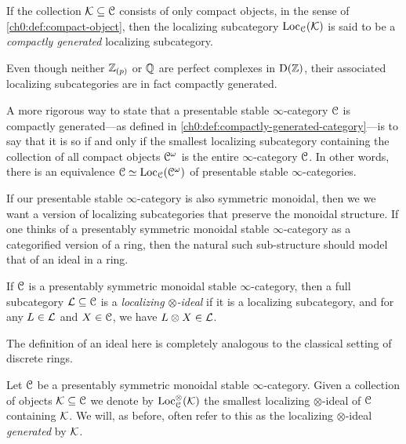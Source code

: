 \begin{remark}
    \label{ch0:rm:compactly-generated-localizing-subcategory}
    If the collection $\mathcal{K} \subseteq \EuScript{C}$ consists of only compact objects, in the sense of \cref{ch0:def:compact-object}, then the localizing subcategory $\operatorname{Loc}_{\EuScript{C}}(\mathcal{K})$ is said to be a \emph{compactly generated} localizing subcategory. 
\end{remark}

\begin{example}
    Even though neither $\mathbb{Z}_{(p)}$ or $\mathbb{Q}$ are perfect complexes in $\mathrm{D}(\mathbb{Z})$, their associated localizing subcategories are in fact compactly generated. 
\end{example}

\begin{remark}
    A more rigorous way to state that a presentable stable $\infty$-category $\EuScript{C}$ is compactly generated---as defined in \cref{ch0:def:compactly-generated-category}---is to say that it is so if and only if the smallest localizing subcategory containing the collection of all compact objects $\EuScript{C}^\omega$ is the entire $\infty$-category $\EuScript{C}$. In other words, there is an equivalence $\EuScript{C}\simeq \operatorname{Loc}_{\EuScript{C}}(\EuScript{C}^\omega)$ of presentable stable $\infty$-categories. 
\end{remark}

If our presentable stable $\infty$-category is also symmetric monoidal, then we we want a version of localizing subcategories that preserve the monoidal structure. If one thinks of a presentably symmetric monoidal stable $\infty$-category as a categorified version of a ring, then the natural such sub-structure should model that of an ideal in a ring. 

\begin{definition}
    \label{ch0:def:localizing-ideal}
    If $\EuScript{C}$ is a presentably symmetric monoidal stable $\infty$-category, then a full subcategory $\mathcal{L}\subseteq \EuScript{C}$ is a \emph{localizing $\otimes$-ideal} if it is a localizing subcategory, and for any $L\in \mathcal{L}$ and $X\in \EuScript{C}$, we have $L\otimes X\in \mathcal{L}$. 
\end{definition}

The definition of an ideal here is completely analogous to the classical setting of discrete rings. 

\begin{definition}
    Let $\EuScript{C}$ be a presentably symmetric monoidal stable $\infty$-category. Given a collection of objects $\mathcal{K}\subseteq \EuScript{C}$ we denote by $\operatorname{Loc}_{\EuScript{C}}^\otimes(\mathcal{K})$ the smallest localizing $\otimes$-ideal of $\EuScript{C}$ containing $\mathcal{K}$. We will, as before, often refer to this as the localizing $\otimes$-ideal \emph{generated} by $\mathcal{K}$. 
\end{definition}

